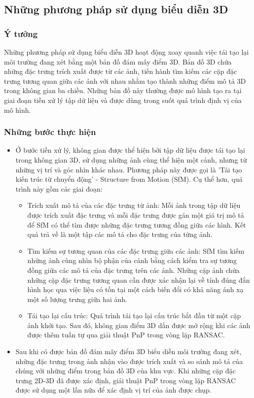 \subsection{Những phương pháp sử dụng biểu diễn 3D}
\subsubsection*{Ý tưởng}
Những phương pháp sử dụng biểu diễn 3D hoạt động xoay quanh việc tái tạo lại môi trường đang xét bằng một bản đồ đám mây điểm 3D. Bản đồ 3D chứa những đặc trưng trích xuất được từ các ảnh, tiến hành tìm kiếm các cặp đặc trưng tương quan giữa các ảnh với nhau nhằm tạo thành những điểm mô tả 3D trong không gian ba chiều. Những bản đồ này thường được mô hình tạo ra tại giai đoạn tiền xử lý tập dữ liệu và được dùng trong suốt quá trình định vị của mô hình.
\subsubsection*{Những bước thực hiện}
\begin{itemize}
    \item Ở bước tiền xử lý, không gian được thể hiện bởi tập dữ liệu được tái tạo lại trong không gian 3D, sử dụng những ảnh cùng thể hiện một cảnh, nhưng từ những vị trí và góc nhìn khác nhau. Phương pháp này được gọi là 'Tái tạo kiến trúc từ chuyển động' - Structure from Motion (SfM). Cụ thể hơn, quá trình này gồm các giai đoạn:
          \begin{itemize}
              \item Trích xuất mô tả của các đặc trưng từ ảnh: Mỗi ảnh trong tập dữ liệu được trích xuất đặc trưng và mỗi đặc trưng được gán một giá trị mô tả để SfM có thể tìm được những đặc trưng tương đồng giữa các hình. Kết quả trả về là một tập các mô tả cho đặc trưng của từng ảnh.
              \item Tìm kiếm sự tương quan của các đặc trưng giữa các ảnh: SfM tìm kiếm những ảnh cùng nhìn bộ phận của cảnh bằng cách kiểm tra sự tương đồng giữa các mô tả của đặc trưng trên các ảnh. Những cặp ảnh chứa những cặp đặc trưng tương quan cần được xác nhận lại về tính đúng đắn hình học qua việc liệu có tồn tại một cách biến đổi có khả năng ánh xạ một số lượng trưng giữa hai ảnh.
              \item Tái tạo lại cấu trúc: Quá trình tái tạo lại cấu trúc bắt đầu từ một cặp ảnh khởi tạo. Sau đó, không gian điểm 3D dần được mở rộng khi các ảnh được thêm tuần tự qua giải thuật PnP trong vòng lặp RANSAC.
          \end{itemize}
    \item Sau khi có được bản đồ đám mây điểm 3D biểu diễn môi trường đang xét, những đặc trưng trong ảnh nhận vào được trích xuất và so sánh mô tả của chúng với những điểm trong bản đồ 3D của khu vực. Khi những cặp đặc trưng 2D-3D đã được xác định, giải thuật PnP trong vòng lặp RANSAC được sử dụng một lần nữa để xác định vị trí của ảnh được chụp.
\end{itemize}
